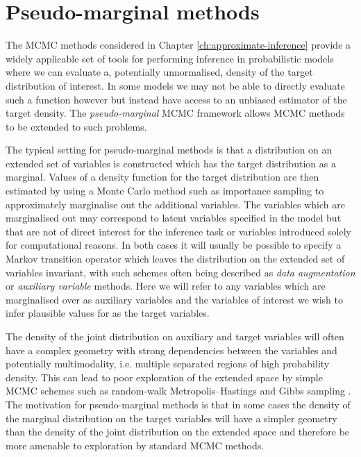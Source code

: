 \chapter{Pseudo-marginal methods}\label{ch:pseudo-marginal-methods}

The \ac{MCMC} methods considered in Chapter \ref{ch:approximate-inference} provide a widely applicable set of tools for performing inference in probabilistic models where we can evaluate a, potentially unnormalised, density of the target distribution of interest. In some models we may not be able to directly evaluate such a function however but instead have access to an unbiased estimator of the target density. The \emph{pseudo-marginal} \ac{MCMC} framework \citep{andrieu2009pseudo} allows \ac{MCMC} methods to be extended to such problems.

The typical setting for pseudo-marginal methods is that a distribution on an extended set of variables is constructed which has the target distribution as a marginal. Values of a density function for the target distribution are then estimated by using a Monte Carlo method such as importance sampling to approximately marginalise out the additional variables. The variables which are marginalised out may correspond to latent variables specified in the model but that are not of direct interest for the inference task or variables introduced solely for computational reasons. In both cases it will usually be possible to specify a Markov transition operator which leaves the distribution on the extended set of variables invariant, with such schemes often being described as \emph{data augmentation} \citep{tanner1987calculation,van2001art} or \emph{auxiliary variable}  \citep{edwards1988generalization,higdon1998auxiliary} methods. Here we will refer to any variables which are marginalised over as auxiliary variables and the variables of interest we wish to infer plausible values for as the target variables.

The density of the joint distribution on auxiliary and target variables will often have a complex geometry with strong dependencies between the variables and potentially multimodality, i.e. multiple separated regions of high probability density. This can lead to poor exploration of the extended space by simple \ac{MCMC} schemes such as random-walk Metropolis--Hastings and Gibbs sampling \citep{andrieu2009pseudo}. The motivation for pseudo-marginal methods is that in some cases the density of the marginal distribution on the target variables will have a simpler geometry than the density of the joint distribution on the extended space and therefore be more amenable to exploration by standard \ac{MCMC} methods. 

